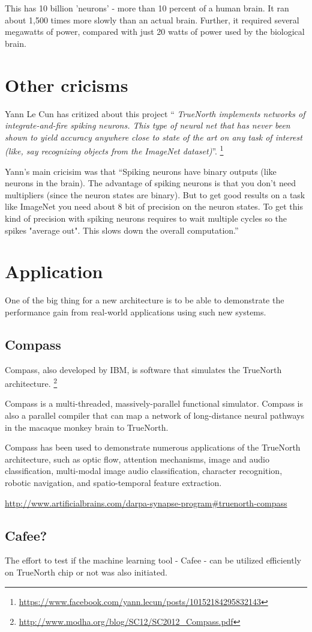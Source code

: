 This has 10 billion 'neurons' - more than 10 percent of a human brain. It ran
about 1,500 times more slowly than an actual brain. Further, it required several
megawatts of power, compared with just 20 watts of power used by the biological
brain.



\section{Other cricisms}

Yann Le Cun has critized about this project ``
{\it TrueNorth implements networks of integrate-and-fire spiking neurons. This
type of neural net that has never been shown to yield accuracy anywhere close to
state of the art on any task of interest (like, say recognizing objects from the
ImageNet dataset)}''.
\footnote{\url{https://www.facebook.com/yann.lecun/posts/10152184295832143}}

Yann's main cricisim was that ``Spiking neurons have binary outputs (like
neurons in the brain). The advantage of spiking neurons is that you don't need
multipliers (since the neuron states are binary). But to get good results on a
task like ImageNet you need about 8 bit of precision on the neuron states. To
get this kind of precision with spiking neurons requires to wait multiple cycles
so the spikes "average out". This slows down the overall computation.''


\section{Application}

One of the big thing for a new architecture is to be able to demonstrate
the performance gain from real-world applications using such new systems.

\subsection{Compass}

Compass, also developed by IBM, is software that simulates the TrueNorth
architecture. \footnote{\url{http://www.modha.org/blog/SC12/SC2012_Compass.pdf}}

Compass is a multi-threaded, massively-parallel functional simulator.
Compass is also a parallel compiler that can map a network of long-distance
neural pathways in the macaque monkey brain to TrueNorth.


Compass has been used to demonstrate numerous applications of the TrueNorth
architecture, such as optic flow, attention mechanisms, image and audio
classification, multi-modal image audio classification, character recognition,
robotic navigation, and spatio-temporal feature extraction.  

\url{http://www.artificialbrains.com/darpa-synapse-program#truenorth-compass}


\subsection{Cafee?} 

The effort to test if the machine learning tool - Cafee - can be utilized
efficiently on TrueNorth chip or not was also initiated.




